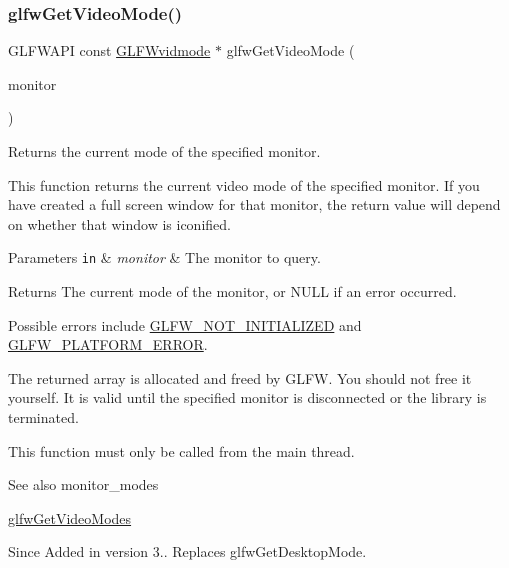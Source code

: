 \subsubsection{\texorpdfstring{glfw\+Get\+Video\+Mode()}{glfwGetVideoMode()}}
{\footnotesize\ttfamily G\+L\+F\+W\+A\+PI const \hyperlink{structGLFWvidmode}{G\+L\+F\+Wvidmode} $\ast$ glfw\+Get\+Video\+Mode (\begin{DoxyParamCaption}\item[{\hyperlink{group__monitor_ga8d9efd1cde9426692c73fe40437d0ae3}{G\+L\+F\+Wmonitor} $\ast$}]{monitor }\end{DoxyParamCaption})}



Returns the current mode of the specified monitor. 

This function returns the current video mode of the specified monitor. If you have created a full screen window for that monitor, the return value will depend on whether that window is iconified.


\begin{DoxyParams}[1]{Parameters}
\mbox{\tt in}  & {\em monitor} & The monitor to query. \\
\hline
\end{DoxyParams}
\begin{DoxyReturn}{Returns}
The current mode of the monitor, or {\ttfamily N\+U\+LL} if an error occurred.
\end{DoxyReturn}
Possible errors include \hyperlink{group__errors_ga2374ee02c177f12e1fa76ff3ed15e14a}{G\+L\+F\+W\+\_\+\+N\+O\+T\+\_\+\+I\+N\+I\+T\+I\+A\+L\+I\+Z\+ED} and \hyperlink{group__errors_gad44162d78100ea5e87cdd38426b8c7a1}{G\+L\+F\+W\+\_\+\+P\+L\+A\+T\+F\+O\+R\+M\+\_\+\+E\+R\+R\+OR}.

The returned array is allocated and freed by G\+L\+FW. You should not free it yourself. It is valid until the specified monitor is disconnected or the library is terminated.

This function must only be called from the main thread.

\begin{DoxySeeAlso}{See also}
monitor\+\_\+modes 

\hyperlink{group__monitor_ga7eaea6132f15e9b5d47eb94f88547f79}{glfw\+Get\+Video\+Modes}
\end{DoxySeeAlso}
\begin{DoxySince}{Since}
Added in version 3.. Replaces {\ttfamily glfw\+Get\+Desktop\+Mode}. 
\end{DoxySince}
\mbox{\label{group__monitor_ga7eaea6132f15e9b5d47eb94f88547f79}} 

